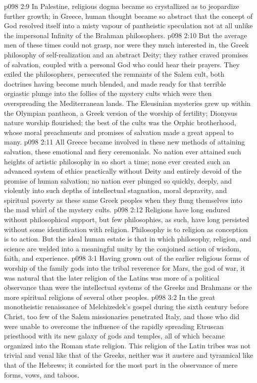 \vs p098 2:9 In Palestine, religious dogma became so crystallized as to jeopardize further growth; in Greece, human thought became so abstract that the concept of God resolved itself into a misty vapour of pantheistic speculation not at all unlike the impersonal Infinity of the Brahman philosophers.
\vs p098 2:10 \pc But the average men of these times could not grasp, nor were they much interested in, the Greek philosophy of self\hyp{}realization and an abstract Deity; they rather craved promises of salvation, coupled with a personal God who could hear their prayers. They exiled the philosophers, persecuted the remnants of the Salem cult, both doctrines having become much blended, and made ready for that terrible orgiastic plunge into the follies of the mystery cults which were then overspreading the Mediterranean lands. The Eleusinian mysteries grew up within the Olympian pantheon, a Greek version of the worship of fertility; Dionysus nature worship flourished; the best of the cults was the Orphic brotherhood, whose moral preachments and promises of salvation made a great appeal to many.
\vs p098 2:11 All Greece became involved in these new methods of attaining salvation, these emotional and fiery ceremonials. No nation ever attained such heights of artistic philosophy in so short a time; none ever created such an advanced system of ethics practically without Deity and entirely devoid of the promise of human salvation; no nation ever plunged so quickly, deeply, and violently into such depths of intellectual stagnation, moral depravity, and spiritual poverty as these same Greek peoples when they flung themselves into the mad whirl of the mystery cults.
\vs p098 2:12 \pc Religions have long endured without philosophical support, but few philosophies, as such, have long persisted without some identification with religion. Philosophy is to religion as conception is to action. But the ideal human estate is that in which philosophy, religion, and science are welded into a meaningful unity by the conjoined action of wisdom, faith, and experience.
\vs p098 3:1 Having grown out of the earlier religious forms of worship of the family gods into the tribal reverence for Mars, the god of war, it was natural that the later religion of the Latins was more of a political observance than were the intellectual systems of the Greeks and Brahmans or the more spiritual religions of several other peoples.
\vs p098 3:2 In the great monotheistic renaissance of Melchizedek’s gospel during the sixth century before Christ, too few of the Salem missionaries penetrated Italy, and those who did were unable to overcome the influence of the rapidly spreading Etruscan priesthood with its new galaxy of gods and temples, all of which became organized into the Roman state religion. This religion of the Latin tribes was not trivial and venal like that of the Greeks, neither was it austere and tyrannical like that of the Hebrews; it consisted for the most part in the observance of mere forms, vows, and taboos.

